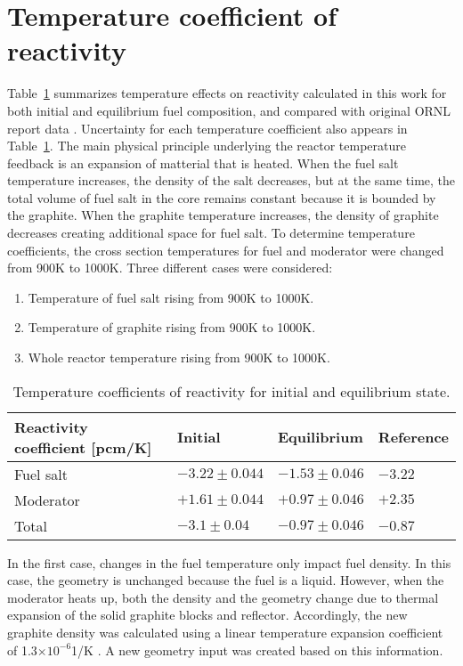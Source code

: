 \section{Temperature coefficient of reactivity}
Table~\ref{tab:tcoef} summarizes temperature effects on reactivity calculated in this work for both initial and equilibrium fuel composition, and compared with original \gls{ORNL} report data \cite{robertson_conceptual_1971}. Uncertainty for each temperature coefficient also appears in Table~\ref{tab:tcoef}. The main physical principle underlying the reactor temperature feedback is an expansion of matterial that is heated. When the fuel salt temperature increases, the density of the salt decreases, but at the same time, the total volume of fuel salt in the core remains constant because it is bounded by the graphite. When the graphite temperature increases, the density of graphite decreases creating additional space for fuel salt. To determine temperature coefficients, the cross section temperatures for fuel and moderator were changed from 900K to 1000K. Three different cases were considered:
\begin{enumerate}
  \item Temperature of fuel salt rising from 900K to 1000K.
  \item Temperature of graphite rising from 900K to 1000K.
  \item Whole reactor temperature rising from 900K to 1000K.
\end{enumerate}

\begin{table}[ht!]
  \centering
  \caption{Temperature coefficients of reactivity for initial and equilibrium state.}
\begin{tabular}{| m{} | m{} | m{} | m{} |} \hline
   Reactivity coefficient [pcm/K]  & Initial      & Equilibrium  & Reference \cite{robertson_conceptual_1971} \\ [5pt]\hline   
Fuel salt        & $-3.22\pm0.044$ & $-1.53\pm0.046$ & $-3.22$  \\ [3pt] \hline
Moderator        & $+1.61\pm0.044$ & $+0.97\pm0.046$ & $+2.35$  \\ [3pt] \hline
Total            & $-3.1\pm0.04$   & $-0.97\pm0.046$ & $-0.87$  \\ [3pt] \hline
\end{tabular}
  \label{tab:tcoef}
\end{table}
In the first case, changes in the fuel temperature only impact fuel density. In this case, the geometry is unchanged because the fuel is a liquid. However, when the moderator heats up, both the density and the geometry change due to thermal expansion of the solid graphite blocks and reflector. Accordingly, the new graphite density was calculated using a linear temperature expansion coefficient of 1.3$\times10^{-6}$1/K \cite{robertson_conceptual_1971}. A new geometry input was created based on this information.


